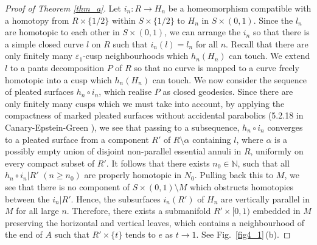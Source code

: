 \documentclass{amsart}
\theoremstyle{definition}
\numberwithin{figure}{section}
\numberwithin{equation}{section}
\newcommand{\blackboard}[1]{\ensuremath{\mathbb{#1}}}
\newcommand{\naturals}{\blackboard{N}}
\def\nn{\naturals}
\def\Int{\mathrm{Int}}
\begin{document}
\begin{proof}[Proof of Theorem \ref{thm_a}]
Let $i_n: R \rightarrow H_n$ be a homeomorphism compatible with a homotopy from $R \times \{1/2\}$ within $S \times \{1/2\}$ to $H_n$ in $S \times (0,1)$.
Since the $l_n$ are homotopic to each other in $S \times (0,1)$, we can arrange the $i_n$ so that there is a simple closed curve $l$ on $R$ such that $i_n(l)=l_n$ for all $n$.
Recall that there are only finitely many $\varepsilon_1$-cusp neighbourhoods which $h_n(H_n)$ can touch.
We extend $l$ to a pants decomposition $P$ of $R$ so that no curve is mapped to a curve freely homotopic into a cusp which $h_n(H_n)$ can touch.
We now consider the sequence of pleated surfaces $h_n \circ i_n$, which realise $P$ as closed geodesics.
Since there are only finitely many cusps which we must take into account, by applying  the compactness of marked pleated surfaces without accidental parabolics (5.2.18 in Canary-Epstein-Green \cite{ceg}), we see that passing to a subsequence, $h_n \circ i_n$ converges to a pleated surface from a component $R'$ of $R \setminus \alpha$ containing $l$, where $\alpha$ is a possibly empty union of disjoint non-parallel essential annuli in $R$, uniformly on every compact subset of $R'$.
%
It follows that there exists $n_0\in  \nn$, such that all $h_n\circ i_n|R'$ $(n\geq n_0)$ are properly homotopic in $N_0$.
Pulling back this to $M$, we see that there is no component of $S \times (0,1) \setminus M$ which obstructs homotopies between the $i_n|R'$.
Hence, the subsurfaces $i_n(R')$ of $H_n$ are vertically parallel in $M$ for all large $n$.
Therefore, there exists a submanifold $R' \times [0,1)$ embedded in $M$ preserving the horizontal and vertical leaves,  which contains a neighbourhood of the end of $A$ such that $R' \times \{t\}$ tends to $e$ as $t \rightarrow 1$.
See Fig.\ \ref{fig4_1}\,(b).



\end{proof}
\end{document}
